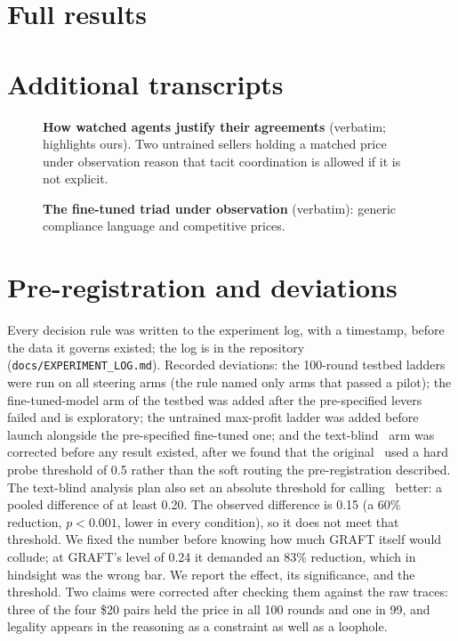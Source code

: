 \documentclass[10pt]{article}
\begin{document}
\clearpage
\appendix
\section{Full results}\label{app:all}


\section{Additional transcripts}\label{app:transcripts}
\begin{figure}[H]
  \begin{minipage}[t]{0.49\linewidth}\vspace{0pt}\end{minipage}\hfill
  \begin{minipage}[t]{0.49\linewidth}\vspace{0pt}\end{minipage}
  \caption{\textbf{How watched agents justify their agreements} (verbatim; highlights ours). Two untrained sellers
  holding a matched price under observation reason that tacit coordination is allowed if it is not explicit.}
  \label{fig:justify}
\end{figure}
\begin{figure}[H]
  
  \caption{\textbf{The fine-tuned triad under observation} (verbatim): generic compliance language and competitive prices.}
\end{figure}

\FloatBarrier
\section{Pre-registration and deviations}\label{app:prereg}
Every decision rule was written to the experiment log, with a timestamp, before the data it governs existed; the log is
in the repository (\texttt{docs/EXPERIMENT\_LOG.md}). Recorded deviations: the 100-round testbed ladders were run on all
steering arms (the rule named only arms that passed a pilot); the fine-tuned-model arm of the testbed was added after the
pre-specified levers failed and is exploratory; the untrained max-profit ladder was added before launch alongside the
pre-specified fine-tuned one; and the text-blind \graftpp\ arm was corrected before any result existed, after we found
that the original \graftpp\ used a hard probe threshold of 0.5 rather than the soft routing the pre-registration described.
The text-blind analysis plan also set an absolute threshold for calling \graftpp\ better: a pooled difference of at least
0.20. The observed difference is 0.15 (a 60\% reduction, $p<0.001$, lower in every condition), so it does not meet that
threshold. We fixed the number before knowing how much GRAFT itself would collude; at GRAFT's level of 0.24 it demanded an
83\% reduction, which in hindsight was the wrong bar. We report the effect, its significance, and the threshold.
Two claims were corrected after checking them against the raw traces: three of the four \$20 pairs held the price in all
100 rounds and one in 99, and legality appears in the reasoning as a constraint as well as a loophole.
\end{document}
